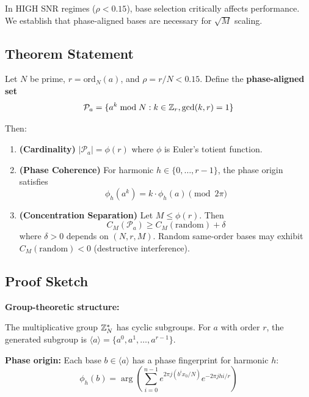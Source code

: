 In HIGH SNR regimes ($\rho < 0.15$), base selection critically affects performance. We establish that phase-aligned bases are necessary for $\sqrt{M}$ scaling.

\subsection{Theorem Statement}

\begin{theorem}
\label{thm:phase_alignment}
Let $N$ be prime, $r = \text{ord}_N(a)$, and $\rho = r/N < 0.15$. Define the \textbf{phase-aligned set}
\begin{equation}
\mathcal{P}_a = \{a^k \bmod N : k \in \mathbb{Z}_r, \gcd(k,r) = 1\}
\end{equation}

Then:
\begin{enumerate}
    \item \textbf{(Cardinality)} $|\mathcal{P}_a| = \phi(r)$ where $\phi$ is Euler's totient function.

    \item \textbf{(Phase Coherence)} For harmonic $h \in \{0,\ldots,r-1\}$, the phase origin satisfies
    \begin{equation}
    \phi_h(a^k) = k \cdot \phi_h(a) \pmod{2\pi}
    \end{equation}

    \item \textbf{(Concentration Separation)} Let $M \leq \phi(r)$. Then
    \begin{equation}
    C_M(\mathcal{P}_a) \geq C_M(\text{random}) + \delta
    \end{equation}
    where $\delta > 0$ depends on $(N,r,M)$. Random same-order bases may exhibit $C_M(\text{random}) < 0$ (destructive interference).
\end{enumerate}
\end{theorem}

\subsection{Proof Sketch}

\textbf{Group-theoretic structure:}

The multiplicative group $\mathbb{Z}_N^*$ has cyclic subgroups. For $a$ with order $r$, the generated subgroup is $\langle a \rangle = \{a^0, a^1, \ldots, a^{r-1}\}$.

\textbf{Phase origin:} Each base $b \in \langle a \rangle$ has a phase fingerprint for harmonic $h$:
\begin{equation}
\phi_h(b) = \arg\left(\sum_{i=0}^{n-1} e^{2\pi j (b^i x_0 / N)} e^{-2\pi j h i / r}\right)
\end{equation}

